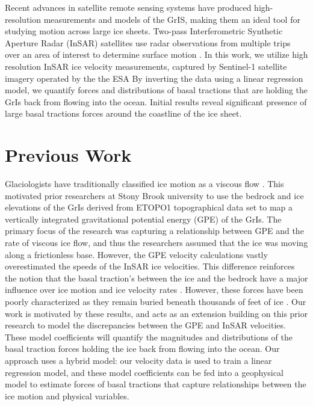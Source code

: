 \documentclass{article}
\begin{document}
Recent advances in satellite remote sensing systems have produced high-resolution measurements and models of the GrIS, making them an ideal tool for studying motion across large ice sheets. Two-pass Interferometric Synthetic Aperture Radar (InSAR) satellites use radar observations from multiple trips over an area of interest to determine surface motion \cite{wild_differential_2019}. In this work, we utilize high resolution InSAR ice velocity measurements, captured by Sentinel-1 satellite imagery operated by the the ESA By inverting the data using a linear regression model, we quantify forces and distributions of basal tractions that are holding the GrIs back from flowing into the ocean. Initial results reveal significant presence of large basal tractions forces around the coastline of the ice sheet.

\section{Previous Work}

Glaciologists have traditionally classified ice motion as a viscous flow \cite{morland_steady_1980}. This motivated prior researchers at Stony Brook university to use the bedrock and ice elevations of the GrIs derived from ETOPO1 topographical data set to map a vertically integrated gravitational potential energy (GPE) of the GrIs. The primary focus of the research was capturing a relationship between GPE and the rate of viscous ice flow, and thus the researchers assumed that the ice was moving along a frictionless base. However, the GPE velocity calculations vastly overestimated the speeds of the InSAR ice velocities. This difference reinforces the notion that the basal traction's between the ice and the bedrock have a major influence over ice motion and ice velocity rates \cite{maier_basal_2021}. However, these forces have been poorly characterized as they remain buried beneath thousands of feet of ice \cite{maier_basal_2021}. Our work is motivated by these results, and acts as an extension building on this prior research to model the discrepancies between the GPE and InSAR velocities. These model coefficients will quantify the magnitudes and distributions of the basal traction forces holding the ice back from flowing into the ocean. Our approach uses a hybrid model: our velocity data is used to train a linear regression model, and these model coefficients can be fed into a geophysical model to estimate forces of basal tractions that capture relationships between the ice motion and physical variables.
\end{document}
